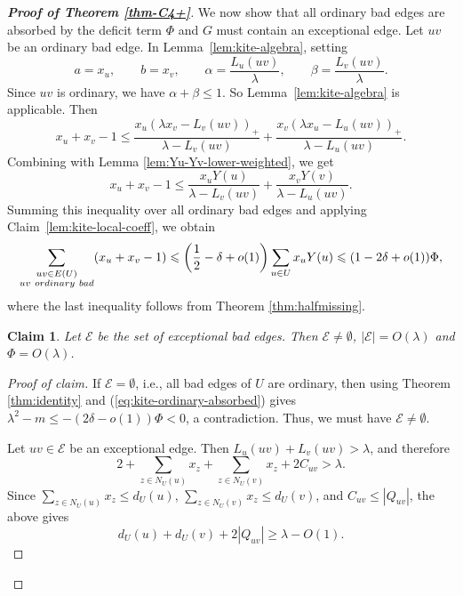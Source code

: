 \documentclass[10pt,a4paper]{amsart}
\newtheorem{claim}[theorem]{Claim}
\renewcommand{\le}{\leqslant}
\renewcommand{\ge}{\geqslant}
\begin{document}
\begin{proof}[{\bf Proof of Theorem \ref{thm-C4+}}]
We now show that all ordinary bad edges are absorbed by the deficit term \(\Phi\) and  $G$ must contain an exceptional edge. 
Let \(uv\) be an ordinary bad edge.  In Lemma~\ref{lem:kite-algebra}, setting 
\[
        a=x_u,\qquad b=x_v,\qquad
        \alpha=\frac{L_u(uv)}{\lambda},\qquad
        \beta=\frac{L_v(uv)}{\lambda}.
\]
Since \(uv\) is ordinary, we have \(\alpha+\beta\le1\). So Lemma~\ref{lem:kite-algebra} is applicable. 
Then 
\[ x_u+x_v -1 \le \frac{x_u (\lambda x_v - L_v(uv))_+}{\lambda - L_v(uv)} + \frac{x_v(\lambda x_u -L_u(uv))_+}{\lambda - L_u(uv)}.   \]
Combining with 
Lemma \ref{lem:Yu-Yv-lower-weighted}, 
we get 
\[
        x_u+x_v-1
        \le
        \frac{x_uY(u)}{\lambda-L_v(uv)}
        +
        \frac{x_vY(v)}{\lambda-L_u(uv)}.
\]
Summing this inequality over all ordinary bad edges and applying
Claim~\ref{lem:kite-local-coeff}, we obtain
\begin{equation}\label{eq:kite-ordinary-absorbed}
        \sum_{\substack{uv\in E(U)\\ uv\ {\rm ordinary\ bad}}}
        (x_u+x_v-1)
        \le
        \left(\frac12-\delta+o(1)\right)
        \sum_{u\in U}x_uY(u)                      \le
        (1-2\delta+o(1))\Phi,
\end{equation}
where the last inequality follows from Theorem \ref{thm:halfmissing}.



\begin{claim}  \label{cl:big-O}
Let \(\mathcal E\) be the set of exceptional bad edges. 
    Then $\mathcal{E}\neq \emptyset$, $|\mathcal E|=O(\lambda)$ and $\Phi = O(\lambda)$. 
\end{claim}

\begin{proof}[Proof of claim]
 If \(\mathcal E=\emptyset\), i.e., all bad edges of $U$ are ordinary, 
then using 
Theorem \ref{thm:identity} and (\ref{eq:kite-ordinary-absorbed}) gives
$  \lambda^2-m
        \le
        -(2\delta-o(1))\Phi < 0$, 
a contradiction.  
Thus, we must have \(\mathcal E\neq\emptyset\). 

Let \(uv\in\mathcal E\) be an exceptional edge.  Then
$  L_u(uv)+L_v(uv)>\lambda$, 
and therefore
\[
        2+\sum_{z\in N_U(u)}x_z + 
        \sum_{z\in N_U(v)}x_z 
        +2C_{uv}>\lambda.
\]
Since \( \sum_{z\in N_U(u)}x_z \le d_U(u)\), \( \sum_{z\in N_U(v)}x_z \le d_U(v)\), and \(C_{uv}\le |Q_{uv}|\), the above gives
\begin{equation}\label{eq:kite-exceptional-size}
        d_U(u)+d_U(v)+2|Q_{uv}| \ge \lambda-O(1).
\end{equation}


\end{proof}
\end{proof}
\end{document}
